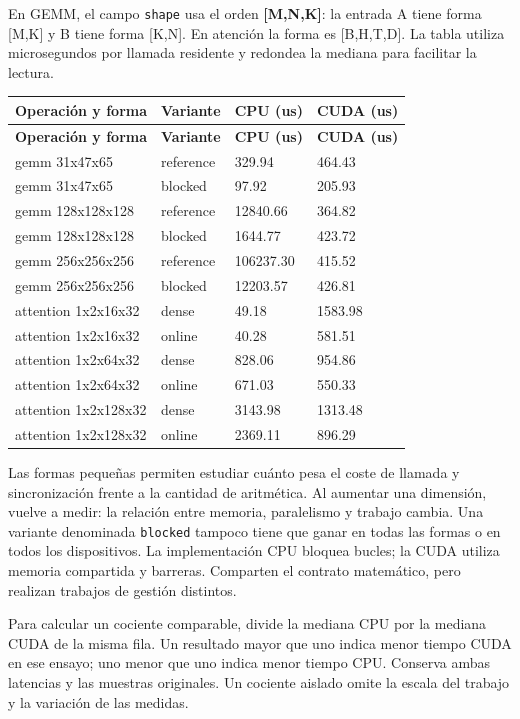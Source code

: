 \documentclass[12pt,a4paper,oneside]{report}
\begin{document}
En GEMM, el campo \texttt{shape} usa el orden \textbf{[M,N,K]}: la entrada A tiene forma [M,K] y B tiene forma [K,N]. En atención la forma es [B,H,T,D]. La tabla utiliza microsegundos por llamada residente y redondea la mediana para facilitar la lectura.

{\small
\begin{longtable}{@{}P{0.22\textwidth}P{0.23\textwidth}P{0.23\textwidth}P{0.23\textwidth}@{}}
\toprule
\textbf{Operación y forma} & \textbf{Variante} & \textbf{CPU (us)} & \textbf{CUDA (us)}\\
\midrule
\endfirsthead
\toprule
\textbf{Operación y forma} & \textbf{Variante} & \textbf{CPU (us)} & \textbf{CUDA (us)}\\
\midrule
\endhead
gemm 31x47x65 & reference & 329.94 & 464.43\\
gemm 31x47x65 & blocked & 97.92 & 205.93\\
gemm 128x128x128 & reference & 12840.66 & 364.82\\
gemm 128x128x128 & blocked & 1644.77 & 423.72\\
gemm 256x256x256 & reference & 106237.30 & 415.52\\
gemm 256x256x256 & blocked & 12203.57 & 426.81\\
attention 1x2x16x32 & dense & 49.18 & 1583.98\\
attention 1x2x16x32 & online & 40.28 & 581.51\\
attention 1x2x64x32 & dense & 828.06 & 954.86\\
attention 1x2x64x32 & online & 671.03 & 550.33\\
attention 1x2x128x32 & dense & 3143.98 & 1313.48\\
attention 1x2x128x32 & online & 2369.11 & 896.29\\
\bottomrule
\end{longtable}
}
Las formas pequeñas permiten estudiar cuánto pesa el coste de llamada y sincronización frente a la cantidad de aritmética. Al aumentar una dimensión, vuelve a medir: la relación entre memoria, paralelismo y trabajo cambia. Una variante denominada \texttt{blocked} tampoco tiene que ganar en todas las formas o en todos los dispositivos. La implementación CPU bloquea bucles; la CUDA utiliza memoria compartida y barreras. Comparten el contrato matemático, pero realizan trabajos de gestión distintos.

Para calcular un cociente comparable, divide la mediana CPU por la mediana CUDA de la misma fila. Un resultado mayor que uno indica menor tiempo CUDA en ese ensayo; uno menor que uno indica menor tiempo CPU. Conserva ambas latencias y las muestras originales. Un cociente aislado omite la escala del trabajo y la variación de las medidas.
\end{document}
